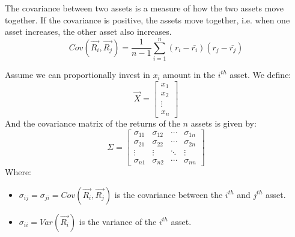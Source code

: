 \begin{definition}
    [Covariance]
    The covariance between two assets is a measure of how the two assets move together. If the covariance is positive, the assets move together, i.e. when one asset increases, the other asset also increases.
    \begin{equation}
        Cov(\overrightarrow{R_i},\overrightarrow{R_j}) = \frac{1}{n-1} \sum_{i=1}^{n} (r_{i} - \bar{r_i})(r_{j} - \bar{r_j})
    \end{equation}
\end{definition}


\begin{definition}
    Assume we can proportionally invest in $x_i$ amount in the $i^{th}$ asset. We define:
    \begin{equation}
        \overrightarrow{X} = \begin{bmatrix}
            x_1    \\
            x_2    \\
            \vdots \\
            x_n
        \end{bmatrix}
    \end{equation}
    And the covariance matrix of the returns of the $n$ assets is given by:
    \begin{equation}
        \Sigma = \begin{bmatrix}
            \sigma_{11} & \sigma_{12} & \cdots & \sigma_{1n} \\
            \sigma_{21} & \sigma_{22} & \cdots & \sigma_{2n} \\
            \vdots      & \vdots      & \ddots & \vdots      \\
            \sigma_{n1} & \sigma_{n2} & \cdots & \sigma_{nn}
        \end{bmatrix}
    \end{equation}
    Where:
    \begin{itemize}
        \item $\sigma_{ij} = \sigma_{ji} = Cov(\overrightarrow{R_i},\overrightarrow{R_j})  $ is the covariance between the $i^{th}$ and $j^{th}$ asset.
        \item $\sigma_{ii} = Var(\overrightarrow{R_i})$ is the variance of the $i^{th}$ asset.
    \end{itemize}
\end{definition}


